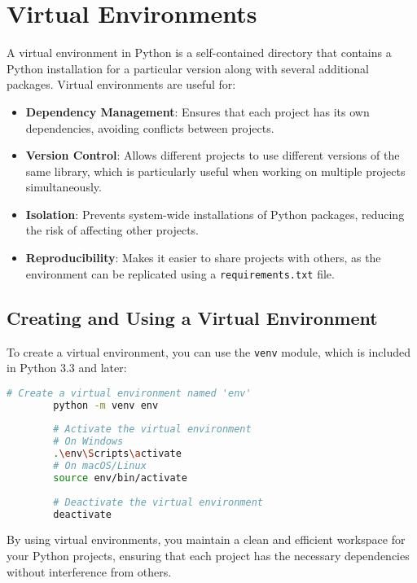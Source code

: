 \documentclass{article}
\begin{document}
	\section{Virtual Environments}
	
	A virtual environment in Python is a self-contained directory that contains a Python installation for a particular version along with several additional packages. Virtual environments are useful for:
	
	\begin{itemize}
		\item \textbf{Dependency Management}: Ensures that each project has its own dependencies, avoiding conflicts between projects.
		\item \textbf{Version Control}: Allows different projects to use different versions of the same library, which is particularly useful when working on multiple projects simultaneously.
		\item \textbf{Isolation}: Prevents system-wide installations of Python packages, reducing the risk of affecting other projects.
		\item \textbf{Reproducibility}: Makes it easier to share projects with others, as the environment can be replicated using a \texttt{requirements.txt} file.
	\end{itemize}
	
	\subsection{Creating and Using a Virtual Environment}
	
	To create a virtual environment, you can use the \texttt{venv} module, which is included in Python 3.3 and later:
	
	\begin{lstlisting}[language=bash]
		# Create a virtual environment named 'env'
		python -m venv env
		
		# Activate the virtual environment
		# On Windows
		.\env\Scripts\activate
		# On macOS/Linux
		source env/bin/activate
		
		# Deactivate the virtual environment
		deactivate
	\end{lstlisting}
	
	By using virtual environments, you maintain a clean and efficient workspace for your Python projects, ensuring that each project has the necessary dependencies without interference from others.
	
\end{document}
